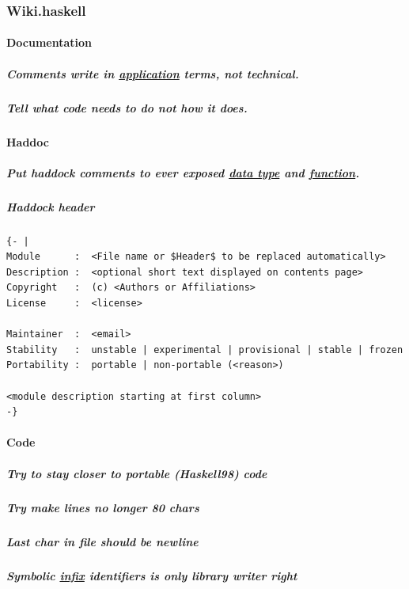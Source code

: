\documentclass[11pt]{article}
\begin{document}
\subsubsection{Wiki.haskell}
\label{sec:orgeabbc6c}

\paragraph{Documentation}
\label{sec:orgd192e6a}

\subparagraph{Comments write in \hyperref[orged2f814]{application} terms, not technical.}
\label{sec:org211c5bd}

\subparagraph{Tell what code needs to do not how it does.}
\label{sec:org888389a}

\paragraph{Haddoc}
\label{sec:org7050876}

\subparagraph{Put haddock comments to ever exposed \hyperref[org965cde3]{data type} and \hyperref[orgeb5cddb]{function}.}
\label{sec:org81be97e}

\subparagraph{Haddock header}
\label{sec:orge8ced2f}
\begin{verbatim}
{- |
Module      :  <File name or $Header$ to be replaced automatically>
Description :  <optional short text displayed on contents page>
Copyright   :  (c) <Authors or Affiliations>
License     :  <license>

Maintainer  :  <email>
Stability   :  unstable | experimental | provisional | stable | frozen
Portability :  portable | non-portable (<reason>)

<module description starting at first column>
-}
\end{verbatim}

\paragraph{Code}
\label{sec:org15e90a3}

\subparagraph{Try to stay closer to portable (Haskell98) code}
\label{sec:org962de32}

\subparagraph{Try make lines no longer 80 chars}
\label{sec:org557835a}

\subparagraph{Last char in file should be newline}
\label{sec:orgeb03af8}

\subparagraph{Symbolic \hyperref[org80fcea9]{infix} identifiers is only library writer right}
\label{sec:org2a55bb8}
\end{document}
